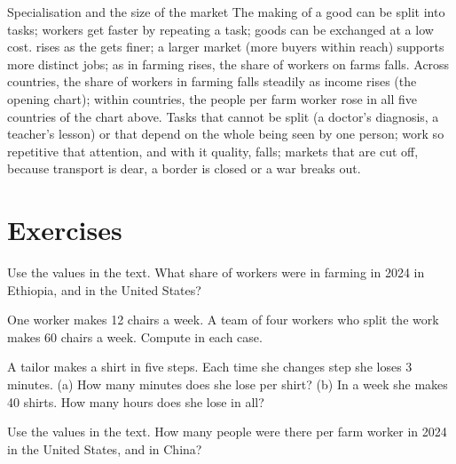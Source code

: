 \begin{model}{Specialisation and the size of the market}
\assumes The making of a good can be split into tasks; workers get faster by
repeating a task; goods can be exchanged at a low cost.
\predicts {} rises as the  gets finer; a larger
market (more buyers within reach) supports more distinct jobs; as 
in farming rises, the share of workers on farms falls.
\tested Across countries, the share of workers in farming falls steadily as income
rises (the opening chart); within countries, the people per farm worker rose in all
five countries of the chart above.
\breaks Tasks that cannot be split (a doctor's diagnosis, a teacher's lesson) or
that depend on the whole being seen by one person; work so repetitive that
attention, and with it quality, falls; markets that are cut off, because transport
is dear, a border is closed or a war breaks out.
\end{model}

\section{Exercises}

\begin{exercise}[$\star$]\label{exo:g7:specialisation:1}
Use the values in the text. What share of workers were in farming in 2024 in Ethiopia,
and in the United States?
\end{exercise}

\begin{exercise}[$\star$]\label{exo:g7:specialisation:2}
One worker makes 12 chairs a week. A team of four workers who split the work makes 60
chairs a week. Compute  in each case.
\end{exercise}

\begin{exercise}[$\star$]\label{exo:g7:specialisation:3}
A tailor makes a shirt in five steps. Each time she changes step she loses 3 minutes.
(a) How many minutes does she lose per shirt? (b) In a week she makes 40 shirts. How
many hours does she lose in all?
\end{exercise}

\begin{exercise}[$\star$]\label{exo:g7:specialisation:4}
Use the values in the text. How many people were there per farm worker in 2024 in the
United States, and in China?
\end{exercise}

